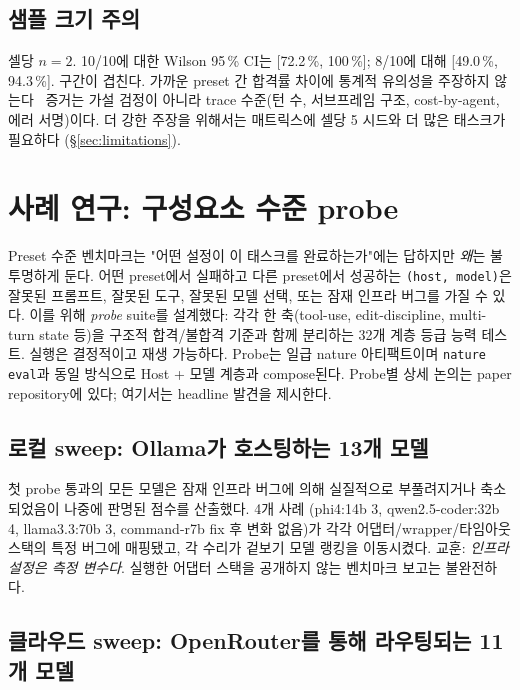 \documentclass[11pt,a4paper]{article}
\begin{document}
\subsection{샘플 크기 주의}

셀당 $n = 2$. 10/10에 대한 Wilson 95\,\% CI는 [72.2\,\%, 100\,\%];
8/10에 대해 [49.0\,\%, 94.3\,\%]. 구간이 겹친다. 가까운 preset 간
합격률 차이에 통계적 유의성을 주장하지 않는다 \textemdash\ 증거는
가설 검정이 아니라 trace 수준(턴 수, 서브프레임 구조, cost-by-agent,
에러 서명)이다. 더 강한 주장을 위해서는 매트릭스에 셀당 5
시드와 더 많은 태스크가 필요하다 (\S\ref{sec:limitations}).

\section{사례 연구: 구성요소 수준 probe}
\label{sec:probes}

Preset 수준 벤치마크는 "어떤 설정이 이 태스크를 완료하는가"에는 답하지만
\emph{왜}는 불투명하게 둔다. 어떤 preset에서 실패하고 다른 preset에서
성공하는 \texttt{(host, model)}은 잘못된 프롬프트, 잘못된 도구, 잘못된
모델 선택, 또는 잠재 인프라 버그를 가질 수 있다. 이를 위해 \emph{probe} suite를
설계했다: 각각 한 축(tool-use, edit-discipline, multi-turn state 등)을
구조적 합격/불합격 기준과 함께 분리하는 32개 계층 등급 능력 테스트.
실행은 결정적이고 재생 가능하다. Probe는 일급 nature 아티팩트이며
\texttt{nature eval}과 동일 방식으로 Host + 모델 계층과 compose된다.
Probe별 상세 논의는 paper repository에 있다; 여기서는 headline 발견을
제시한다.

\subsection{로컬 sweep: Ollama가 호스팅하는 13개 모델}

첫 probe 통과의 모든 모델은 잠재 인프라 버그에 의해 실질적으로 부풀려지거나
축소되었음이 나중에 판명된 점수를 산출했다. 4개 사례
(phi4:14b 3, qwen2.5-coder:32b 4,
llama3.3:70b 3, command-r7b fix 후 변화 없음)가 각각
어댑터/wrapper/타임아웃 스택의 특정 버그에 매핑됐고, 각 수리가 겉보기
모델 랭킹을 이동시켰다. 교훈: \emph{인프라 설정은 측정 변수다}. 실행한
어댑터 스택을 공개하지 않는 벤치마크 보고는 불완전하다.

\subsection{클라우드 sweep: OpenRouter를 통해 라우팅되는 11개 모델}
\end{document}
